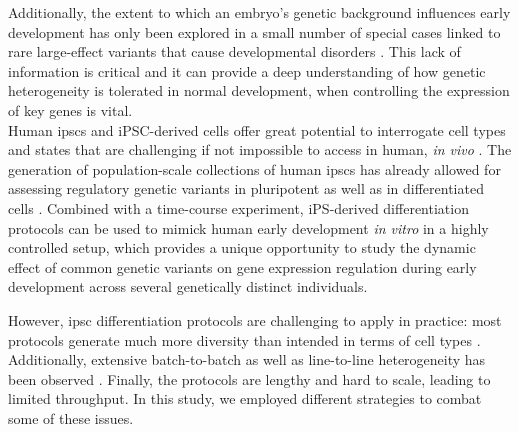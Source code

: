 Additionally, the extent to which an embryo’s genetic background influences early development has only been explored in a small number of special cases linked to rare large-effect variants that cause developmental disorders \cite{}.
This lack of information is critical and it can provide a deep understanding of how genetic heterogeneity is tolerated in normal development, when controlling the expression of key genes is vital.\\

Human \gls{ipsc}s and iPSC-derived cells offer great potential to interrogate cell types and states that are challenging if not impossible to access in human, \textit{in vivo} \cite{kilpinen2017common}.
The generation of population-scale collections of human \gls{ipsc}s \cite{kilpinen2017common, carcamo2017analysis} has already allowed for assessing regulatory genetic variants in pluripotent \cite{kilpinen2017common, carcamo2017analysis} as well as in differentiated cells \cite{schwartzentruber2018molecular, alasoo2018shared, pashos2017large}.
Combined with a time-course experiment, iPS-derived differentiation protocols can be used to mimick human early development \textit{in vitro} in a highly controlled setup, which provides a unique opportunity to study the dynamic effect of common genetic variants on gene expression regulation during early development across several genetically distinct individuals.

However, \gls{ipsc} differentiation protocols are challenging to apply in practice: most protocols generate much more diversity than intended in terms of cell types 
\cite{bock2011reference}.
Additionally, extensive batch-to-batch as well as line-to-line heterogeneity has been observed \cite{schwartzentruber2018molecular, carcamo2017analysis}. 
Finally, the protocols are lengthy and hard to scale, leading to limited throughput.
In this study, we employed different strategies to combat some of these issues.


